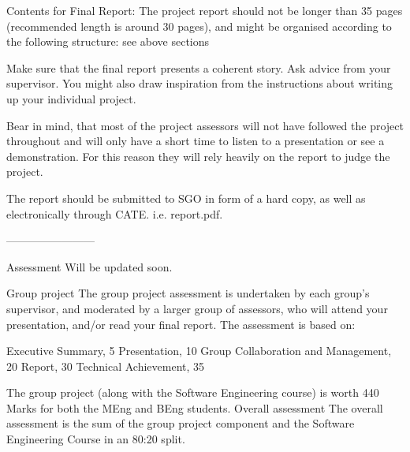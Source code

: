 \documentclass[a4wide, 11pt]{article}
\begin{document}
Contents for Final Report: The project report should not be longer than 35 pages (recommended length is around 30 pages), and might be organised according to the following structure: see above sections

Make sure that the final report presents a coherent story. Ask advice from your supervisor. You might also draw inspiration from the instructions about writing up your individual project.

Bear in mind, that most of the project assessors will not have followed the project throughout and will only have a short time to listen to a presentation or see a demonstration. For this reason they will rely heavily on the report to judge the project.

The report should be submitted to SGO in form of a hard copy, as well as electronically through CATE. i.e. report.pdf. 

------------------------

Assessment
Will be updated soon.

Group project
The group project assessment is undertaken by each group's supervisor, and moderated by a larger group of assessors, who will attend your presentation, and/or read your final report. The assessment is based on:

    Executive Summary, 5
    Presentation, 10
    Group Collaboration and Management, 20
    Report, 30
    Technical Achievement, 35

The group project (along with the Software Engineering course) is worth 440 Marks for both the MEng and BEng students.
Overall assessment
The overall assessment is the sum of the group project component and the Software Engineering Course in an 80:20 split. 
\end{document}
